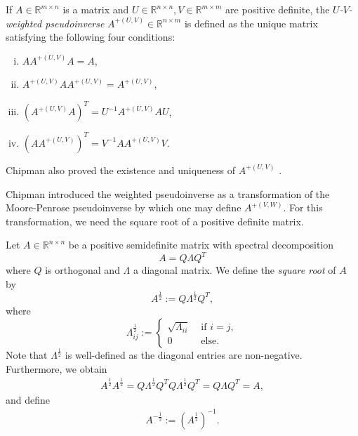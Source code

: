 \documentclass[a4paper,11pt]{report}
\begin{document}
\begin{Def}\label{def:weighted-pseudoinverse}
If $A\in\mathbb{R}^{m\times n}$ is a matrix and $U\in\mathbb{R}^{n\times n},V\in\mathbb{R}^{m\times m}$ are positive definite, the \emph{$U$-$V$-weighted pseudoinverse} $A^{+(U,V)}\in\mathbb{R}^{n\times m}$ is defined as the unique matrix satisfying the following four conditions:
\begin{enumerate}[(i)]
\item
$AA^{+(U,V)}A=A$, 
\item
$A^{+(U,V)}AA^{+(U,V)}=A^{+(U,V)}$, 
\item
$\left(A^{+(U,V)}A\right)^T=U^{-1}A^{+(U,V)}AU$, 
\item
$\left(AA^{+(U,V)}\right)^T=V^{-1}AA^{+(U,V)}V$.
\end{enumerate}
Chipman also proved the existence and uniqueness of $A^{+(U,V)}$ \cite[][1084f.]{Chipman1964}.
\end{Def}

\begin{Par}
Chipman introduced the weighted pseudoinverse as a transformation of the Moore-Penrose pseudoinverse by which one may define $A^{+(V,W)}$. For this transformation, we need the square root of a positive definite matrix.
\end{Par}

\begin{Def}
Let $A\in\mathbb{R}^{n\times n}$ be a positive semidefinite matrix with spectral decomposition
\[
A=Q\Lambda Q^T
\]
where $Q$ is orthogonal and $\Lambda$ a diagonal matrix. We define the \emph{square root} of $A$ by
\begin{equation}
A^{\frac12}:=Q\Lambda^{\frac12}Q^T,
\end{equation}
where
\begin{equation}
\Lambda^{\frac12}_{ij}:=\begin{cases}
\sqrt{\Lambda_{ii}}&\text{ if }i=j,\\
0&\text{ else}.
\end{cases}
\end{equation}
Note that $\Lambda^{\frac12}$ is well-defined as the diagonal entries are non-negative. Furthermore, we obtain
\begin{align*}
A^{\frac12}A^{\frac12}=Q\Lambda^{\frac12}Q^TQ\Lambda^{\frac12}Q^T=Q\Lambda Q^T=A,
\end{align*}
and define
\begin{align*}
A^{-\frac12}:=\left(A^{\frac12}\right)^{-1}.
\end{align*}
\end{Def}
\end{document}
